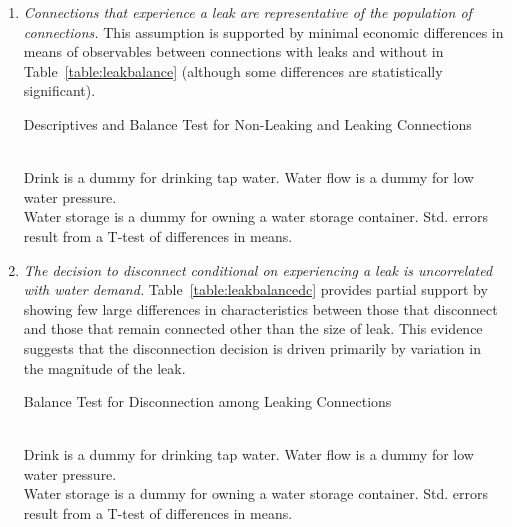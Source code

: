 \documentclass[12pt]{article}
\begin{document}
\begin{appendices}
\begin{enumerate}
	\item \textit{ Connections that experience a leak are representative of the population of connections. }  This assumption is supported by minimal economic differences in means of observables between connections with leaks and without in Table~\ref{table:leakbalance} (although some differences are statistically significant).  
\begin{table}
\centering
\caption{Descriptives and Balance Test for Non-Leaking and Leaking Connections}\label{table:leakbalance}
 \\
\footnotesize{Drink is a dummy for drinking tap water.  Water flow is a dummy for low water pressure. \\ Water storage is a dummy for owning a water storage container.  Std. errors result from a T-test of differences in means.}
\end{table}

	\item  \textit{ The decision to disconnect conditional on experiencing a leak is uncorrelated with water demand. }  Table~\ref{table:leakbalancedc} provides partial support by showing few large differences in characteristics between those that disconnect and those that remain connected other than the size of leak.  This evidence suggests that the disconnection decision is driven primarily by variation in the magnitude of the leak.
\begin{table}
\centering
\caption{Balance Test for Disconnection among Leaking Connections}\label{table:leakbalancedc}
 \\
\footnotesize{Drink is a dummy for drinking tap water.  Water flow is a dummy for low water pressure. \\ Water storage is a dummy for owning a water storage container. Std. errors result from a T-test of differences in means.}
\end{table}


\end{enumerate}
\end{appendices}
\end{document}
